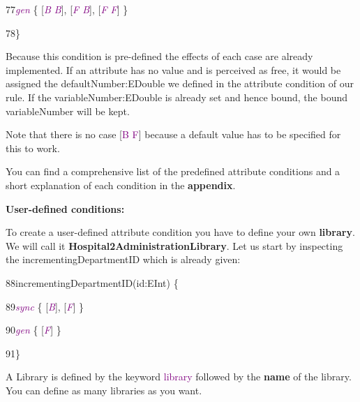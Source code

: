 {{77\hspace{1cm}\textcolor{Purple}{\textit{gen}} \{ [\textcolor{Purple}{\textit{B B}}], [\textcolor{Purple}{\textit{F B}}], [\textcolor{Purple}{\textit{F F}}] \}

78\hspace{0.5cm}\}\newline

}

Because this condition is pre-defined the effects of each case are already implemented. If an attribute has no value and is perceived as free, it would be assigned the \textsf{defaultNumber:EDouble} we defined in the attribute condition of our rule. If the \textsf{variableNumber:EDouble} is already set and hence bound, the bound variableNumber will be kept.

Note that there is no case [\textcolor{Purple}{B F}] because a default value has to be specified for this to work.\newline

You can find a comprehensive list of the predefined attribute conditions and a short explanation of each condition in the \textbf{appendix}.\newline

\textbf{User-defined conditions:}

To create a user-defined attribute condition you have to define your own \textbf{library}. We will call it \textbf{Hospital2AdministrationLibrary}. Let us start by inspecting the \textsf{incrementingDepartmentID} which is already given:\newline

{

88\hspace{0.5cm}incrementingDepartmentID(id:EInt) \{
	
89\hspace{1cm}\textcolor{Purple}{\textit{sync}} \hspace{0.3cm}\{ [\textcolor{Purple}{\textit{B}}], [\textcolor{Purple}{\textit{F}}] \}
		
90\hspace{1cm}\textcolor{Purple}{\textit{gen}} \hspace{0.3cm}\{ [\textcolor{Purple}{\textit{F}}] \}
		
91\hspace{0.5cm}\}\newline
}

A Library is defined by the keyword \textcolor{Purple}{library} followed by the \textbf{name} of the library. You can define as many libraries as you want.

}
